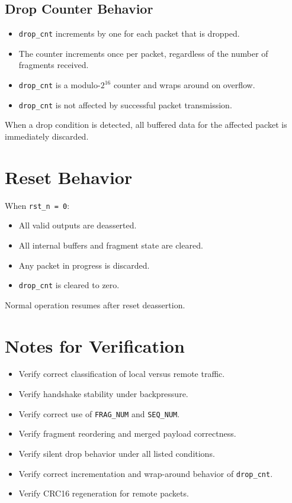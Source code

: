 \documentclass[11pt,a4paper]{article}
\begin{document}
\subsection{Drop Counter Behavior}

\begin{itemize}
  \item \texttt{drop\_cnt} increments by one for each packet that is dropped.
  \item The counter increments once per packet, regardless of the number of fragments received.
  \item \texttt{drop\_cnt} is a modulo-$2^{16}$ counter and wraps around on overflow.
  \item \texttt{drop\_cnt} is not affected by successful packet transmission.
\end{itemize}

When a drop condition is detected, all buffered data for the affected packet is immediately discarded.

\section{Reset Behavior}

When \texttt{rst\_n = 0}:
\begin{itemize}
  \item All valid outputs are deasserted.
  \item All internal buffers and fragment state are cleared.
  \item Any packet in progress is discarded.
  \item \texttt{drop\_cnt} is cleared to zero.
\end{itemize}

Normal operation resumes after reset deassertion.

\section{Notes for Verification}

\begin{itemize}
  \item Verify correct classification of local versus remote traffic.
  \item Verify handshake stability under backpressure.
  \item Verify correct use of \texttt{FRAG\_NUM} and \texttt{SEQ\_NUM}.
  \item Verify fragment reordering and merged payload correctness.
  \item Verify silent drop behavior under all listed conditions.
  \item Verify correct incrementation and wrap-around behavior of \texttt{drop\_cnt}.
  \item Verify CRC16 regeneration for remote packets.
\end{itemize}
\end{document}
